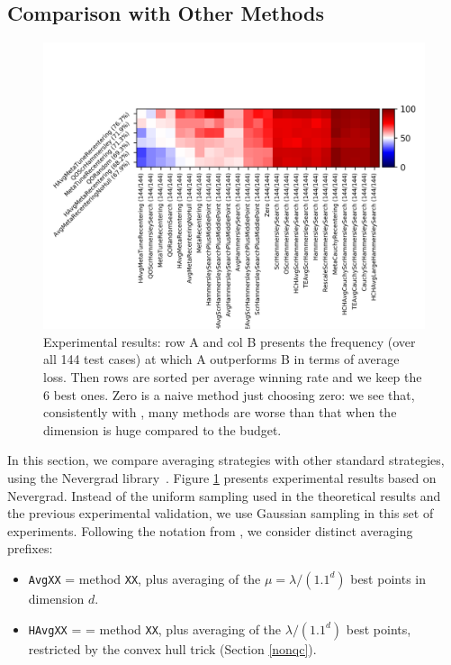 \subsection{Comparison with Other Methods}
\begin{figure}
    \centering
    \includegraphics{sections/appendix/foga2021-kbest/samples/fight_all.png}
    \caption{Experimental results: row A and col B presents the frequency (over all 144 test cases) at which A outperforms B in terms of average loss. Then rows are sorted per average winning rate and we keep the 6 best ones. Zero is a naive method just choosing zero: we see that, consistently with \cite{icmldoe}, many methods are worse than that when the dimension is huge compared to the budget.}
    \label{figxp}
\end{figure}
In this section, we compare averaging strategies with other standard strategies, using the Nevergrad library~\cite{nevergrad}. 
Figure \ref{figxp} presents experimental results based on Nevergrad. Instead of the uniform sampling used in the theoretical results and the previous experimental validation, we use Gaussian sampling in this set of experiments. Following the notation from \cite{ppsnkbest}, we consider distinct averaging prefixes:
\begin{itemize}
    \item \texttt{AvgXX} = method \texttt{XX}, plus averaging of the $\mu=\lambda/(1.1^d)$ best points in dimension $d$.
    \item \texttt{HAvgXX} = = method  \texttt{XX}, plus averaging of the $\lambda/(1.1^d)$ best points, restricted by {the convex hull trick (Section \ref{nonqc}).}
\end{itemize}
